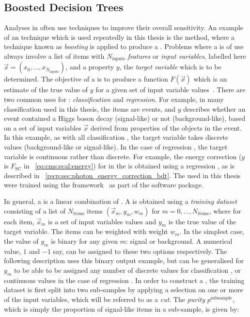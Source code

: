 \subsection{Boosted Decision Trees}
\label{reco:sec:bdt}

Analyses in \HEP often use \MVA techniques to improve their overall sensitivity. An example of an \MVA technique which is used repeatedly in this thesis is the \DT method, where a technique known as \emph{boosting} is applied to produce a \BDT. Problems where a \BDT is of use always involve a list of items with $N_{\textrm{inputs}}$ \emph{features} or \emph{input variables}, labelled here $\vec{x} =(x_0, ... ,x_{N_{\textrm{inputs}}})$, and a property $y$, the \emph{target variable} which is to be determined. The objective of a \BDT is to produce a function $F(\vec{x})$ which is an estimate of the true value of $y$ for a given set of input variable values~\cite{friedman2001}. There are two common uses for \BDT\s: \emph{classification} and \emph{regression}. For example, in many classification \BDT\s used in this thesis, the items are events, and $y$ describes whether an  event contained a Higgs boson decay (signal-like) or not (background-like), based on a set of input variables $\vec{x}$ derived from properties of the \PF objects in the event. In this example, as with all classification \BDT\s, the target variable takes discrete values (background-like or signal-like). In the case of regression \BDT\s, the target variable is  continuous rather than discrete. For example, the energy correction ($y$ is $F_{\text{SC}}$ in \Eq~\ref{eq:cms:ecal:energy}) for \SC\s in the \ECAL is obtained using a regression \BDT, as is described in \Sec~\ref{recp:sec:photon_energy_correction_bdt}. The \BDT\s used in this thesis were trained using the \TMVA framework~\cite{TMVA} as part of the \ROOT software package. 

In general, a \BDT is a linear combination of \DT\s. A \DT is obtained using a \emph{training dataset} consisting of a list of $N_{\textrm{items}}$ items $(\vec{x}_{m},y_{m},w_{m})$ for $m=0,...,N_{\textrm{items}}$, where for each item, $\vec{x}_{m}$ is a set of input variables values and $y_{m}$ is the true value of the target variable. The items can be weighted with weight $w_{m}$. In the simplest case, the value of $y_{m}$ is binary for any given $m$: signal or background. A numerical value, $1$ and $-1$ say, can be assigned to these two options respectively. The following description uses this binary output example, but can be generalised for $y_{m}$ to be able to be assigned any number of discrete values for classification \DT\s, or continuous values in the case of regression \DT\s.
In order to construct a \DT, the training dataset is first split into two sub-samples by applying a selection on one or more of the input variables, which will be referred to as a \emph{cut}. The \emph{purity} $p^{\textrm{subsample}}$, which is simply the proportion of signal-like items in a sub-sample, is given by:

